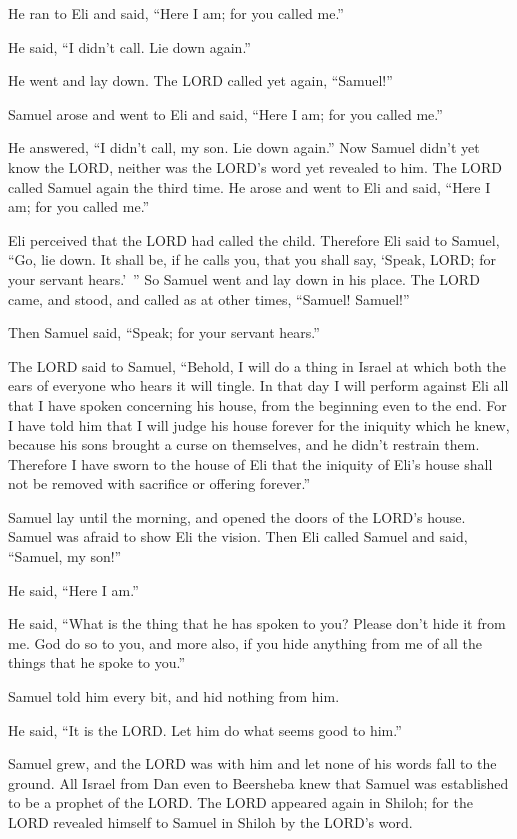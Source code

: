 \myverse{}He ran to Eli and said, “Here I am; for you called me.”

He said, “I didn’t call. Lie down again.”

He went and lay down.
\myverse{}The LORD called yet again, “Samuel!”

Samuel arose and went to Eli and said, “Here I am; for you called me.”

He answered, “I didn’t call, my son. Lie down again.”
\myverse{}Now Samuel didn’t yet know the LORD, neither was the LORD’s word yet revealed
to him.
\myverse{}The LORD called Samuel again the third time. He arose and went to Eli and said,
“Here I am; for you called me.”

Eli perceived that the LORD had called the child.
\myverse{}Therefore Eli said to Samuel, “Go, lie down. It shall be, if he calls you, that
you shall say, ‘Speak, LORD; for your servant hears.’ ” So Samuel went and lay down in his place.
\myverse{}The LORD came, and stood, and called as at other times, “Samuel! Samuel!”

Then Samuel said, “Speak; for your servant hears.”

\myverse{}The LORD said to Samuel, “Behold, I will do a thing in Israel
at which both the ears of everyone who hears it will tingle.
\myverse{}In that day I will perform against Eli all that I have spoken concerning his
house, from the beginning even to the end.
\myverse{}For I have told him that I will judge his house forever for the iniquity which
he knew, because his sons brought a curse on themselves, and he didn’t restrain them.
\myverse{}Therefore I have sworn to the house of Eli that the iniquity of Eli’s house
shall not be removed with sacrifice or offering forever.”

\myverse{}Samuel lay until the morning, and opened the doors of the LORD’s
house. Samuel was afraid to show Eli the vision.
\myverse{}Then Eli called Samuel and said, “Samuel, my son!”

He said, “Here I am.”

\myverse{}He said, “What is the thing that he has spoken to you? Please
don’t hide it from me. God do so to you, and more also, if you hide anything from me of all the things
that he spoke to you.”

\myverse{}Samuel told him every bit, and hid nothing from him.

He said, “It is the LORD. Let him do what seems good to him.”

\myverse{}Samuel grew, and the LORD was with him and let none of his words
fall to the ground.
\myverse{}All Israel from Dan even to Beersheba knew that Samuel was established to
be a prophet of the LORD.
\myverse{}The LORD appeared again in Shiloh; for the LORD revealed himself to Samuel
in Shiloh by the LORD’s word.


